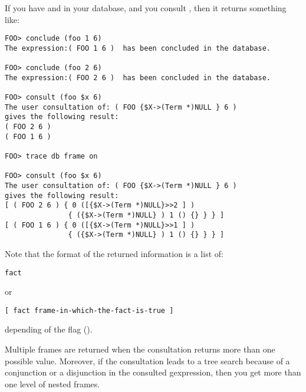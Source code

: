 If you have  and  in your database, and
you consult , then it returns something like:
\begin{verbatim}
FOO> conclude (foo 1 6)
The expression:( FOO 1 6 )  has been concluded in the database.

FOO> conclude (foo 2 6)
The expression:( FOO 2 6 )  has been concluded in the database.

FOO> consult (foo $x 6)
The user consultation of: ( FOO {$X->(Term *)NULL } 6 ) 
gives the following result:
( FOO 2 6 ) 
( FOO 1 6 ) 

FOO> trace db frame on

FOO> consult (foo $x 6)
The user consultation of: ( FOO {$X->(Term *)NULL } 6 )
gives the following result:
[ ( FOO 2 6 ) { 0 ([{$X->(Term *)NULL}>>2 ] )
               { ({$X->(Term *)NULL} ) 1 () {} } } ]
[ ( FOO 1 6 ) { 0 ([{$X->(Term *)NULL}>>1 ] )
               { ({$X->(Term *)NULL} ) 1 () {} } } ]
\end{verbatim}

Note that the format of the returned information is a list of:
\begin{verbatim}
fact
\end{verbatim}
or
\begin{verbatim}
[ fact frame-in-which-the-fact-is-true ]
\end{verbatim}
depending of the  flag ().

Multiple frames are returned when the consultation returns more than one
possible value. Moreover, if the consultation leads to a tree search
because of a conjunction or a disjunction in the consulted gexpression,
then you get more than one level of nested frames.

